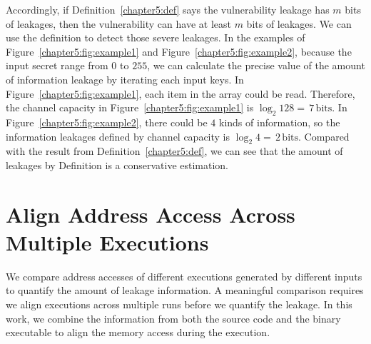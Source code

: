 Accordingly, if Definition~\ref{chapter5:def} says the vulnerability leakage has $m$ bits of leakages, then the vulnerability can have at least $m$ bits of leakages. We can use the definition to detect those severe leakages. In the examples of Figure~\ref{chapter5:fig:example1} and Figure~\ref{chapter5:fig:example2}, because the input secret range from $0$ to $255$, we can calculate the precise value of the amount of information leakage by iterating each input keys. In Figure~\ref{chapter5:fig:example1}, each item in the array could be read. Therefore, the channel capacity in Figure~\ref{chapter5:fig:example1} is $\log_2{128} = \,7\, \mathrm{bits}$. In Figure~\ref{chapter5:fig:example2}, there could be $4$ kinds of information, so the information leakages defined by channel capacity is $\log_2{4} = \,2\, \mathrm{bits}$. Compared with the result from Definition~\ref{chapter5:def}, we can see that the amount of leakages by Definition is a conservative estimation.

\section{Align Address Access Across Multiple Executions}
We compare address accesses of different executions generated by different inputs to quantify the amount of leakage information. A meaningful comparison requires we align executions across multiple runs before we quantify the leakage. In this work, we combine the information from both the source code and the binary executable to align the memory access during the execution.


